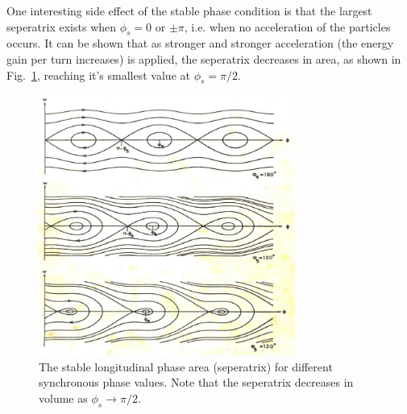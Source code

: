 One interesting side effect of the stable phase condition is that the largest seperatrix exists when $\phi_{s}= 0$ or $\pm \pi$, i.e. when no acceleration of the particles occurs. It can be shown that as stronger and stronger acceleration (the energy gain per turn increases) is applied, the seperatrix decreases in area, as shown in Fig.~\ref{fig:longSynFreq}, reaching it's smallest value at $\phi_{s} = \pi / 2$.

\begin{figure}
\begin{center}
\includegraphics[width=0.75\textwidth]{appendices/figures/longPhaseDiag.png}
\end{center}
\caption{The stable longitudinal phase area (seperatrix) for different synchronous phase values. Note that the seperatrix decreases in volume as $\phi_{s} \rightarrow \pi / 2$.}
\label{fig:longSynFreq}
\end{figure}